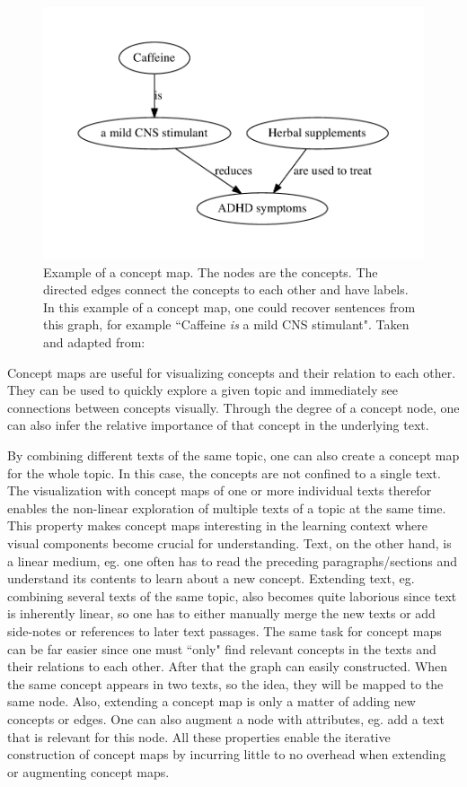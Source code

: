 \begin{figure}[htb!]
\centering
\includegraphics[width=0.5\linewidth]{assets/figures/concept_map.pdf}
\caption[Example: Concept map]{Example of a concept map. The nodes are the concepts. The directed edges connect the concepts to each other and have labels. In this example of a concept map, one could recover sentences from this graph, for example ``Caffeine \textit{is} a mild CNS stimulant". Taken and adapted from: \cite{Falke2017}}
\label{fig:concept_map}
\end{figure}

Concept maps are useful for visualizing concepts and their relation to each other.
They can be used to quickly explore a given topic and immediately see connections between concepts visually.
Through the degree of a concept node, one can also infer the relative importance of that concept in the underlying text.

By combining different texts of the same topic, one can also create a concept map for the whole topic.
In this case, the concepts are not confined to a single text.
The visualization with concept maps of one or more individual texts therefor enables the non-linear exploration of multiple texts of a topic at the same time.
This property makes concept maps interesting in the learning context where visual components become crucial for understanding.
Text, on the other hand, is a linear medium, eg. one often has to read the preceding paragraphs/sections and understand its contents to learn about a new concept.
Extending text, eg. combining several texts of the same topic, also becomes quite laborious since text is inherently linear, so one has to either manually merge the new texts or add side-notes or references to later text passages.
The same task for concept maps can be far easier since one must ``only" find relevant concepts in the texts and their relations to each other. After that the graph can easily constructed.
When the same concept appears in two texts, so the idea, they will be mapped to the same node.
Also, extending a concept map is only a matter of adding new concepts or edges.
One can also augment a node with attributes, eg. add a text that is relevant for this node.
All these properties enable the iterative construction of concept maps by incurring little to no overhead when extending or augmenting concept maps.

